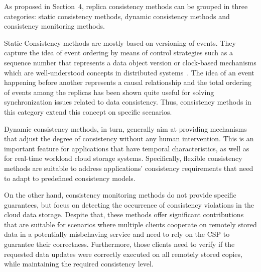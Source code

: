 As proposed in Section~4, {\al replica} consistency methods can be grouped in three categories: static consistency methods, dynamic consistency methods and consistency monitoring methods.

Static Consistency methods are mostly based on versioning of events. They capture the idea of event ordering by means of control strategies such as a sequence number that represents a data object version or clock-based mechanisms which are well-under\-stood concepts in distributed systems~\cite{fidge1991logical, lamport1978time, mattern1989virtual}. The idea of an event happening before another represents a causal relationship and the total ordering of events among the replicas has been shown quite useful for solving synchronization issues related to data consistency. Thus, consistency methods in this category extend this concept on specific scenarios.

Dynamic consistency methods, in turn, generally aim at providing mechanisms that adjust the degree of consistency without any human intervention. This is an important feature for applications that have temporal characteristics, 
as well as for real-time workload cloud storage systems. Specifically, flexible consistency methods are suitable to address applications’ consistency requirements that need to adapt to predefined consistency models.

On the other hand, consistency monitoring methods do not provide specific guarantees, but focus on detecting the occurrence of consistency violations in the cloud data storage.  Despite that, these methods offer significant contributions that are suitable for scenarios where multiple clients cooperate on remotely stored data in a potentially misbehaving service and need to rely on the CSP to guarantee their correctness. Furthermore, those clients need to verify if the requested data updates were correctly executed on all remotely stored copies, while maintaining the required consistency level.

